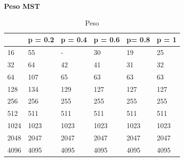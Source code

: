 \documentclass[]{article}
\begin{document}
\textbf{Peso MST}\\

\begin{table}[H]
\centering
\caption{Peso}
\label{tab:mst_weight}
\begin{tabular}{|l|l|l|l|l|l|} 
\cline{2-6}
\multicolumn{1}{l|}{} & p = 0.2 & p = 0.4 & p = 0.6 & p= 0.8 & p = 1  \\ 
\hline
16                    & 55      & -       & 30      & 19     & 25     \\
32                    & 64      & 42      & 41      & 31     & 32     \\
64                    & 107     & 65      & 63      & 63     & 63     \\
128                   & 134     & 129     & 127     & 127    & 127    \\
256                   & 256     & 255     & 255     & 255    & 255    \\
512                   & 511     & 511     & 511     & 511    & 511    \\
1024                  & 1023    & 1023    & 1023    & 1023   & 1023   \\
2048                  & 2047    & 2047    & 2047    & 2047   & 2047   \\
4096                  & 4095    & 4095    & 4095    & 4095   & 4095   \\
\hline
\end{tabular}
\end{table}
\end{document}
